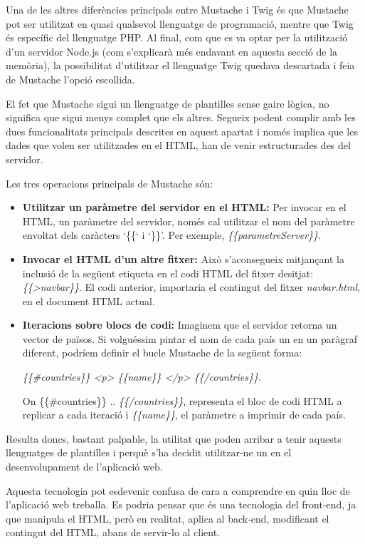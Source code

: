     Una de les altres diferències principals entre Mustache i Twig és que Mustache pot ser utilitzat en quasi qualsevol llenguatge de programació, mentre que Twig és específic del llenguatge PHP. Al final, com que es va optar per la utilització d'un servidor Node.js (com s'explicarà més endavant en aquesta secció de la memòria), la possibilitat d'utilitzar el llenguatge Twig quedava descartada i feia de Mustache l’opció escollida.

    El fet que Mustache sigui un llenguatge de plantilles sense gaire lògica, no significa que sigui menys complet que els altres. Segueix podent complir amb les dues funcionalitats principals descrites en aquest apartat i només implica que les dades que volen ser utilitzades en el HTML, han de venir estructurades des del servidor.

    Les tres operacions principals de Mustache són:

    \begin{itemize}
        \item \textbf{Utilitzar un paràmetre del servidor en el HTML:} Per invocar en el HTML, un paràmetre del servidor, només cal utilitzar el nom del paràmetre envoltat dels caràcters `\{\{‘ i `\}\}’. Per exemple, \emph{\{\{parametreServer\}\}}.
        \item \textbf{Invocar el HTML d'un altre fitxer:} Això s'aconsegueix mitjançant la inclusió de la següent etiqueta en el codi HTML del fitxer desitjat: \emph{\{\{>navbar\}\}}. El codi anterior, importaria el contingut del fitxer \emph{navbar.html}, en el do\-cu\-ment HTML actual.
        \item \textbf{Iteracions sobre blocs de codi:} Imaginem que el servidor retorna un vector de països. Si volguéssim pintar el nom de cada país un en un paràgraf diferent, podríem definir el bucle Mustache de la següent forma:

        \emph{\{\{\#countries\}\} <p> \{\{name\}\} </p> \{\{/countries\}\}}.

        On \{\{\#countries\}\} .. \emph{\{\{/countries\}\}}, representa el bloc de codi HTML a replicar a cada iteració i \emph{\{\{name\}\}}, el paràmetre a imprimir de cada país.
    \end{itemize}

    Resulta doncs, bastant palpable, la utilitat que poden arribar a tenir aquests llenguatges de plantilles i perquè s'ha decidit utilitzar-ne un en el desenvolupament de l'aplicació web.

    Aquesta tecnologia pot esdevenir confusa de cara a comprendre en quin lloc de l’aplicació web treballa. Es podria pensar que és una tecnologia del front-end, ja que manipula el HTML, però en realitat, aplica al back-end, modificant el contingut del HTML, abans de servir-lo al client.

